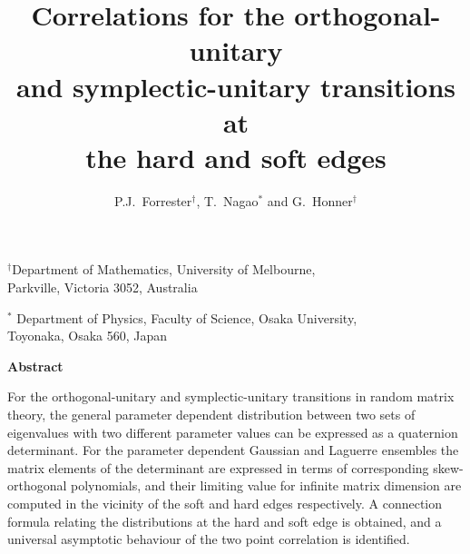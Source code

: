 \headheight 0cm
\headsep 0cm
\newlength{\mytopmargin}
\newlength{\myleftmargin}
\setlength{\mytopmargin}{2.8cm}
\setlength{\myleftmargin}{2.5cm}
\setlength{\topmargin}{-1in}
\setlength{\oddsidemargin}{-1in}
\addtolength{\topmargin}{\mytopmargin}
\addtolength{\oddsidemargin}{\myleftmargin}
\textwidth 16cm
\textheight 24cm
\setlength{\parskip}{1ex}

\renewcommand{\theequation}{\thesection.\arabic{equation}}

\newcommand{\beqa}{\begin{eqnarray}}
\newcommand{\eeqa}{\end{eqnarray}}


\title{\Large\bf Correlations for the orthogonal-unitary \\
and symplectic-unitary transitions at \\
the hard and soft edges}
\author{P.J.~Forrester$^{\dagger}$, T.~Nagao$^{*}$ and 
G.~Honner$^{\dagger}$}

\date{}
\maketitle
\begin{center}
 $^{\dagger}$Department of Mathematics, University of Melbourne, \\
 Parkville, Victoria 3052, Australia
\end{center}
\begin{center}
$^*$
Department of Physics, Faculty of Science, Osaka University, \\
Toyonaka, Osaka 560, Japan
\end{center}

\bigskip
\begin{center}
\bf Abstract
\end{center}
\par
\bigskip
\noindent

For the orthogonal-unitary and symplectic-unitary transitions in random
matrix theory, the general parameter dependent distribution between
two sets of eigenvalues with two different parameter values can be
expressed as a quaternion determinant. For the parameter dependent
Gaussian and Laguerre ensembles the matrix elements of the determinant
are expressed in terms of corresponding skew-orthogonal polynomials,
and their limiting value for infinite matrix dimension are
computed in the vicinity of the soft and hard edges respectively.
A connection formula relating the distributions at the hard and soft
edge is obtained, and a universal asymptotic behaviour of the two point
correlation is identified.
